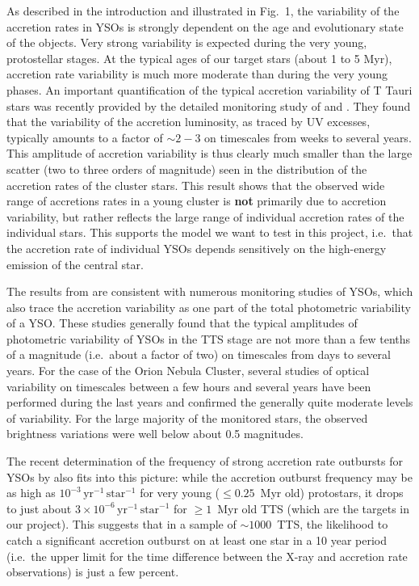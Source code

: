 \documentclass[10pt,fleqn,twoside,a4paper]{article}
\begin{document}
As described in the introduction and illustrated in Fig.~1,
the variability of the accretion rates in YSOs is strongly dependent
on the age and evolutionary state of the objects.
Very strong variability is expected during the very young, protostellar stages.
%
At the typical ages of our target stars (about 1 to 5 Myr),
accretion rate variability is much more moderate than during the
very young phases.
%
An important quantification of the typical accretion variability of T Tauri stars
was recently
provided by the detailed monitoring study of 
\citet{Venuti14} and \citet{Venuti15}.
 They found that the variability of the accretion luminosity, as traced
by UV excesses, 
typically amounts to a factor of $\sim 2-3$ on timescales
from weeks to several years. This amplitude of accretion variability
is thus clearly much smaller than the large scatter 
(two to three orders of magnitude)
seen in the distribution of the accretion rates of the cluster stars.
This result shows that the observed wide range of accretions rates
in a young cluster is \textbf{not} primarily due to accretion variability, 
but rather reflects the large range of individual accretion rates of 
the individual stars.
This supports the model we want to test in this project, i.e.~that 
the accretion rate of individual YSOs depends sensitively on the high-energy 
emission of the central  star.

The results from \citet{Venuti14} are consistent with numerous monitoring
studies of YSOs, which also trace the accretion variability as one part
of the total photometric variability of a YSO.
%
%
These studies generally found that the typical
amplitudes of photometric variability of YSOs in the TTS stage
are not more than a few tenths of a magnitude (i.e.~about a factor of two)
on timescales from days to several years.
For the case of the Orion Nebula Cluster, several studies of 
optical variability
on timescales between a few hours and several years
have been performed during the last years
\citep{Herbst02,Stassun06,Stassun07,Parihar09,Rice15} and confirmed
the generally quite moderate levels of variability.
For the large majority of the monitored stars, the observed brightness 
variations were well below about 0.5 magnitudes.

The recent determination of the
frequency of strong accretion rate outbursts for YSOs by \citet{HF15}
also fits into this picture:
 while
the accretion outburst frequency may be as high as
 $10^{-3}\,\mathrm{yr}^{-1}\,\mathrm{star}^{-1}$ for very young
($\le 0.25$~Myr old) protostars, it drops to just about
$3 \times 10^{-6}\,\mathrm{yr}^{-1}\,\mathrm{star}^{-1}$ for
$\ge 1$~Myr old TTS (which are the targets in our project).
This suggests that 
in a sample of $\sim 1000$~TTS,
the likelihood to catch a significant accretion outburst
on at least one star in a 10 year period (i.e.~the upper limit for the
time difference between the X-ray and accretion rate observations)
is just a few percent.
\end{document}
